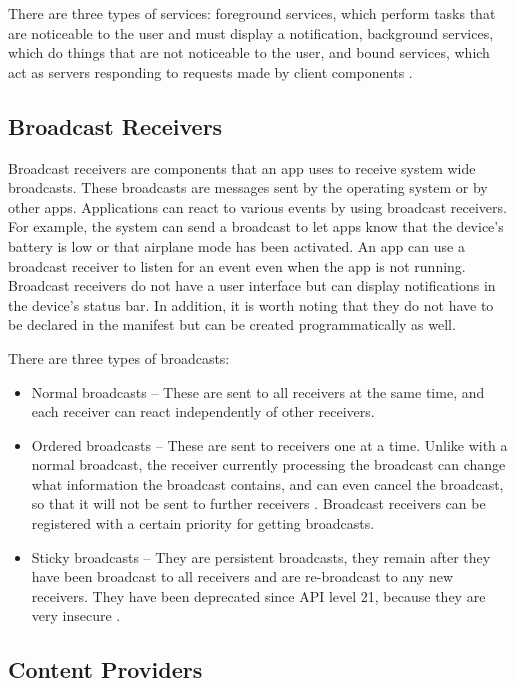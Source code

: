     There are three types of services: foreground services, which perform tasks that are noticeable to the user and must display a notification, background services, which do things that are not noticeable to the user, and bound services, which act as servers responding to requests made by client components \cite{services_overview}.
    
    \subsection{Broadcast Receivers}
        \label{subsec:receivers}
        
    Broadcast receivers are components that an app uses to receive system wide broadcasts. These broadcasts are messages sent by the operating system or by other apps. Applications can react to various events by using broadcast receivers. For example, the system can send a broadcast to let apps know that the device’s battery is low or that airplane mode has been activated. An app can use a broadcast receiver to listen for an event even when the app is not running. Broadcast receivers do not have a user interface but can display notifications in the device’s status bar. In addition, it is worth noting that they do not have to be declared in the manifest but can be created programmatically as well.
    
    There are three types of broadcasts:
    \begin{itemize}
        \item Normal broadcasts – These are sent to all receivers at the same time, and each receiver can react independently of other receivers.
        \item Ordered broadcasts – These are sent to receivers one at a time. Unlike with a normal broadcast, the receiver currently processing the broadcast can change what information the broadcast contains, and can even cancel the broadcast, so that it will not be sent to further receivers \cite{broadcasts_overview}. Broadcast receivers can be registered with a certain priority for getting broadcasts.
        \item Sticky broadcasts – They are persistent broadcasts, they remain after they have been broadcast to all receivers and are re-broadcast to any new receivers. They have been deprecated since API level 21, because they are very insecure \cite{sticky_broadcast}.
    \end{itemize}
    
    \subsection{Content Providers}
        \label{subsec:content_providers}
        
